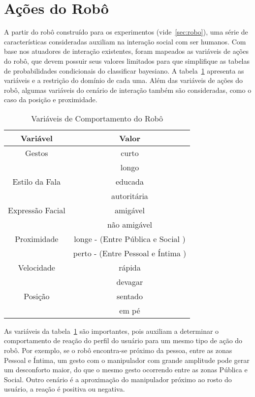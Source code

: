 \section{Ações do Robô}
\label{sec:comportamento-robo}
A partir do robô construído para os experimentos (vide~\ref{sec:robo}), uma série de características consideradas auxiliam na interação social com ser humanos. Com base nos atuadores de interação existentes, foram mapeados as variáveis de ações do robô, que devem possuir seus valores limitados para que simplifique as tabelas de probabilidades condicionais do classificar bayesiano. A tabela~\ref{tab:variaveisvalores} apresenta as variáveis e a restrição do domínio de cada uma. Além das variáveis de ações do robô, algumas variáveis do cenário de interação também são consideradas, como o caso da posição e proximidade.

\begin{table}[!ht]
	\caption{Variáveis de Comportamento do Robô}
	\label{tab:variaveisvalores}
	\centering
	\begin{tabular}{c | c}
		\hline
		Variável & Valor \\
		\hline
		Gestos & curto \\
		& longo \\
		\hline
		Estilo da Fala & educada \\
		& autoritária \\
		\hline
		Expressão Facial & amigável \\
		& não amigável \\
		\hline
		Proximidade & longe - (Entre Pública e Social ) \\
		& perto - (Entre Pessoal e Íntima ) \\
		\hline
		Velocidade & rápida \\
		& devagar \\
		\hline
		Posição & sentado \\
		& em pé \\
		\hline
	\end{tabular}
\end{table}

As variáveis da tabela~\ref{tab:variaveisvalores} são importantes, pois auxiliam a determinar o comportamento de reação do perfil do usuário para um mesmo tipo de ação do robô. Por exemplo, se o robô encontra-se próximo da pessoa, entre as zonas Pessoal e Íntima, um gesto com o manipulador com grande amplitude pode gerar um desconforto maior, do que o mesmo gesto ocorrendo entre as zonas Pública e Social. Outro cenário é a aproximação do manipulador próximo ao rosto do usuário, a reação é positiva ou negativa.

